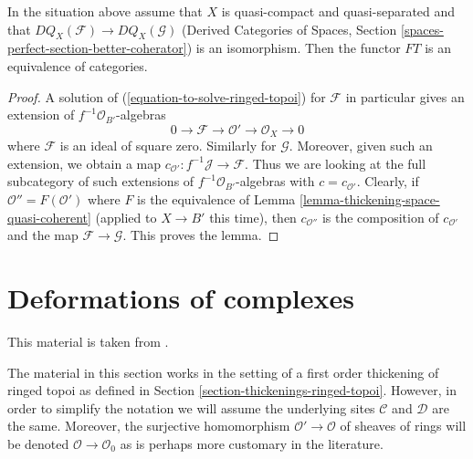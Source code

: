 \begin{lemma}
\label{lemma-thickening-over-thickening-space-quasi-coherent}
In the situation above assume that $X$ is quasi-compact and quasi-separated
and that $DQ_X(\mathcal{F}) \to DQ_X(\mathcal{G})$
(Derived Categories of Spaces, Section
\ref{spaces-perfect-section-better-coherator})
is an isomorphism. Then the functor $FT$ is an equivalence of categories.
\end{lemma}

\begin{proof}
A solution of (\ref{equation-to-solve-ringed-topoi}) for $\mathcal{F}$
in particular gives an extension of $f^{-1}\mathcal{O}_{B'}$-algebras
$$
0 \to \mathcal{F} \to \mathcal{O}' \to \mathcal{O}_X \to 0
$$
where $\mathcal{F}$ is an ideal of square zero. Similarly for $\mathcal{G}$.
Moreover, given such an extension, we obtain a map
$c_{\mathcal{O}'} : f^{-1}\mathcal{J} \to \mathcal{F}$.
Thus we are looking at the full subcategory of such extensions
of $f^{-1}\mathcal{O}_{B'}$-algebras with $c = c_{\mathcal{O}'}$.
Clearly, if $\mathcal{O}'' = F(\mathcal{O}')$ where
$F$ is the equivalence of Lemma \ref{lemma-thickening-space-quasi-coherent}
(applied to $X \to B'$ this time),
then $c_{\mathcal{O}''}$ is the composition of
$c_{\mathcal{O}'}$ and the map $\mathcal{F} \to \mathcal{G}$.
This proves the lemma.
\end{proof}







\section{Deformations of complexes}
\label{section-thickenings-complexes}

\noindent
This material is taken from \cite{lieblich-complexes}.

\medskip\noindent
The material in this section works in the setting of a first order thickening
of ringed topoi as defined in Section \ref{section-thickenings-ringed-topoi}.
However, in order to simplify the notation we will assume the underlying
sites $\mathcal{C}$ and $\mathcal{D}$ are the same.
Moreover, the surjective homomorphism $\mathcal{O}' \to \mathcal{O}$
of sheaves of rings will be denoted $\mathcal{O} \to \mathcal{O}_0$
as is perhaps more customary in the literature.

